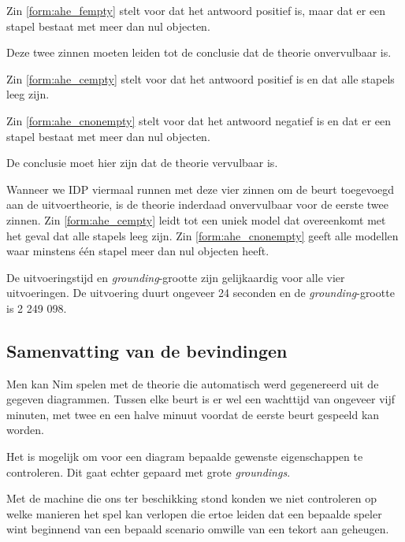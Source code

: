 Zin \ref{form:ahe_fempty} stelt voor dat het antwoord positief is, maar dat er een stapel bestaat met meer dan nul objecten.

Deze twee zinnen moeten leiden tot de conclusie dat de theorie onvervulbaar is.

Zin \ref{form:ahe_cempty} stelt voor dat het antwoord positief is en dat alle stapels leeg zijn.

Zin \ref{form:ahe_cnonempty} stelt voor dat het antwoord negatief is en dat er een stapel bestaat met meer dan nul objecten.

De conclusie moet hier zijn dat de theorie vervulbaar is.

Wanneer we IDP viermaal runnen met deze vier zinnen om de beurt toegevoegd aan de uitvoertheorie, is de theorie inderdaad onvervulbaar voor de eerste twee zinnen. Zin \ref{form:ahe_cempty} leidt tot een uniek model dat overeenkomt met het geval dat alle stapels leeg zijn. Zin \ref{form:ahe_cnonempty} geeft alle modellen waar minstens \'e\'en stapel meer dan nul objecten heeft.

De uitvoeringstijd en \textit{grounding}-grootte zijn gelijkaardig voor alle vier uitvoeringen. De uitvoering duurt ongeveer 24 seconden en de \textit{grounding}-grootte is 2 249 098.

\subsection{Samenvatting van de bevindingen}
Men kan Nim spelen met de theorie die automatisch werd gegenereerd uit de gegeven diagrammen. Tussen elke beurt is er wel een wachttijd van ongeveer vijf minuten, met twee en een halve minuut voordat de eerste beurt gespeeld kan worden.

Het is mogelijk om voor een diagram bepaalde gewenste eigenschappen te controleren. Dit gaat echter gepaard met grote \textit{groundings}.

Met de machine die ons ter beschikking stond konden we niet controleren op welke manieren het spel kan verlopen die ertoe leiden dat een bepaalde speler wint beginnend van een bepaald scenario omwille van een tekort aan geheugen.